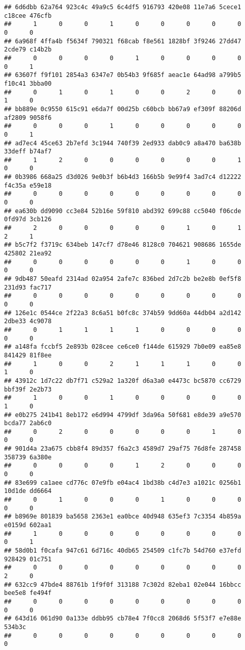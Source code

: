 \documentclass[
]{article}
\begin{document}
\begin{verbatim}
## 6d6dbb 62a764 923c4c 49a9c5 6c4df5 916793 420e08 11e7a6 5cece1 c18cee 476cfb 
##      1      0      0      1      0      0      0      0      0      0      0 
## 6a968f 4ffa4b f5634f 790321 f68cab f8e561 1828bf 3f9246 27dd47 2cde79 c14b2b 
##      0      0      0      0      1      0      0      0      0      0      1 
## 63607f f9f101 2854a3 6347e7 0b54b3 9f685f aeac1e 64ad98 a799b5 f10c41 3bba00 
##      0      1      0      1      0      0      2      0      0      1      0 
## bb889e 0c9550 615c91 e6da7f 00d25b c60bcb bb67a9 ef309f 88206d af2809 9058f6 
##      0      0      0      1      0      0      0      0      0      0      1 
## ad7ec4 45ce63 2b7efd 3c1944 740f39 2ed933 dab0c9 a8a470 ba638b 33deff b74af7 
##      1      2      0      0      0      0      0      0      1      0      0 
## 0b3986 668a25 d3d026 9e0b3f b6b4d3 166b5b 9e99f4 3ad7c4 d12222 f4c35a e59e18 
##      0      0      0      0      0      0      0      0      0      0      0 
## ea630b dd9090 cc3e84 52b16e 59f810 abd392 699c88 cc5040 f06cde 0fd97d 3cb126 
##      2      0      0      0      0      0      1      0      1      2      1 
## b5c7f2 f3719c 634beb 147cf7 d78e46 8128c0 704621 908686 1655de 425802 21ea92 
##      0      0      0      0      0      0      1      0      0      0      0 
## 9db487 50eafd 2314ad 02a954 2afe7c 836bed 2d7c2b be2e8b 0ef5f8 231d93 fac717 
##      0      0      0      0      0      0      0      0      0      0      0 
## 126e1c 0544ce 2f22a3 8c6a51 b0fc8c 374b59 9dd60a 44db04 a2d142 2dbe33 4c9078 
##      0      1      1      1      1      0      0      0      0      0      0 
## a148fa fccbf5 2e893b 028cee ce6ce0 f144de 615929 7b0e09 ea85e8 841429 81f8ee 
##      1      0      0      2      1      1      1      0      0      1      0 
## 43912c 1d7c22 db7f71 c529a2 1a320f d6a3a0 e4473c bc5870 cc6729 bbf39f 2e2b73 
##      1      0      0      1      0      0      0      0      0      1      0 
## e0b275 241b41 8eb172 e6d994 4799df 3da96a 50f681 e8de39 a9e570 bcda77 2ab6c0 
##      0      2      0      0      0      0      0      1      0      0      0 
## 901d4a 23a675 cbb8f4 89d357 f6a2c3 4589d7 29af75 76d8fe 287458 358739 6a380e 
##      0      0      0      0      1      2      0      0      0      0      0 
## 83e699 ca1aee cd776c 07e9fb e04ac4 1bd38b c4d7e3 a1021c 0256b1 10d1de dd6664 
##      0      1      0      0      0      1      0      0      0      0      0 
## b8969e 801839 ba5658 2363e1 ea0bce 40d948 635ef3 7c3354 4b859a e0159d 602aa1 
##      1      0      0      0      0      0      0      0      0      0      1 
## 58d0b1 f0cafa 947c61 6d716c 40db65 254509 c1fc7b 54d760 e37efd 928429 01c751 
##      0      0      0      0      0      0      0      0      0      2      0 
## 632cc9 47bde4 88761b 1f9f0f 313188 7c302d 82eba1 02e044 16bbcc bee5e8 fe494f 
##      0      0      0      0      0      0      0      0      0      0      0 
## 643d16 061d90 0a133e ddbb95 cb78e4 7f0cc8 2068d6 5f53f7 e7e88e 534b3c 
##      0      0      0      0      0      0      0      0      0      0
\end{verbatim}
\end{document}
